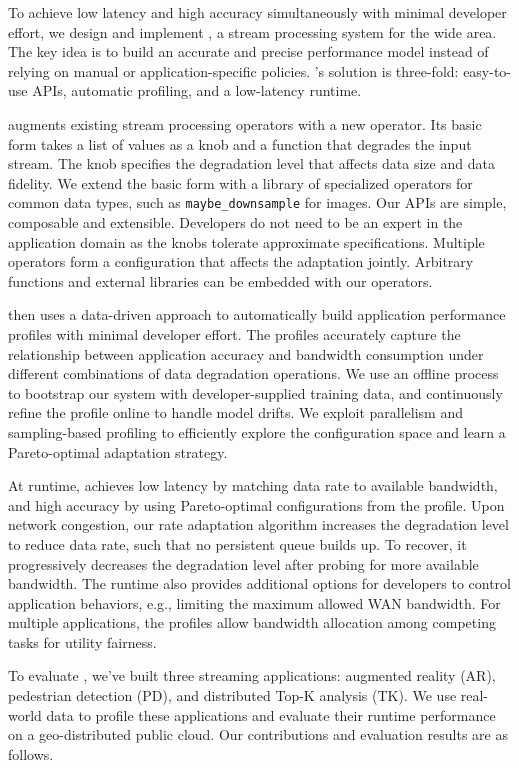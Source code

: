 To achieve low latency and high accuracy simultaneously with minimal developer
effort, we design and implement \sysname{}, a stream processing system for the
wide area. The key idea is to build an accurate and precise performance model
instead of relying on manual or application-specific policies. \sysname{}'s
solution is three-fold: easy-to-use APIs, automatic profiling, and a low-latency
runtime.

\sysname{} augments existing stream processing operators with a new \maybe{}
operator. Its basic form takes a list of values as a knob and a function that
degrades the input stream. The knob specifies the degradation level that affects
data size and data fidelity. We extend the basic form with a library of
specialized operators for common data types, such as \texttt{maybe\_downsample}
for images. Our APIs are simple, composable and extensible. Developers do not
need to be an expert in the application domain as the knobs tolerate approximate
specifications. Multiple operators form a configuration that affects the
adaptation jointly. Arbitrary functions and external libraries can be embedded
with our operators.

\sysname{} then uses a data-driven approach to automatically build application
performance profiles with minimal developer effort. The profiles accurately
capture the relationship between application accuracy and bandwidth consumption
under different combinations of data degradation operations. We use an offline
process to bootstrap our system with developer-supplied training data, and
continuously refine the profile online to handle model drifts. We exploit
parallelism and sampling-based profiling to efficiently explore the
configuration space and learn a Pareto-optimal adaptation strategy.

At runtime, \sysname{} achieves low latency by matching data rate to available
bandwidth, and high accuracy by using Pareto-optimal configurations from the
profile. Upon network congestion, our rate adaptation algorithm increases the
degradation level to reduce data rate, such that no persistent queue builds
up. To recover, it progressively decreases the degradation level after probing
for more available bandwidth. The runtime also provides additional options for
developers to control application behaviors, e.g., limiting the maximum allowed
WAN bandwidth. For multiple applications, the profiles allow bandwidth
allocation among competing tasks for utility fairness.

To evaluate \sysname{}, we've built three streaming applications: augmented
reality (AR), pedestrian detection (PD), and distributed Top-K analysis (TK). We
use real-world data to profile these applications and evaluate their runtime
performance on a geo-distributed public cloud. Our contributions and evaluation
results are as follows.

